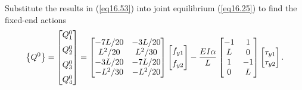 \documentclass{AeroStructure-ERJohnson}
\begin{document}
Substitute the results in (\ref{eq16.53}) into joint equilibrium (\ref{eq16.25}) to find the fixed-end actions
\begin{align}\label{eq16.54}
\left\{Q^{0}\right\}=\left[\begin{array}{@{}l@{}}Q_{1}^{0} \\[6pt]Q_{2}^{0} \\[6pt]Q_{3}^{0} \\[6pt]Q_{4}^{0}\end{array}\right]=\left[\begin{array}{@{}cc@{}}-7 L / 20 & -3 L / 20 \\L^{2} / 20 & L^{2} / 30 \\-3 L / 20 & -7 L / 20 \\-L^{2} / 30 & -L^{2} / 20\end{array}\right]\left[\begin{array}{@{}l@{}}f_{y 1} \\[3pt]f_{y 2}\end{array}\right]-\frac{E I \alpha}{L}\left[\begin{array}{@{}cc@{}}-1 & 1 \\L & 0 \\1 & -1 \\0 & L\end{array}\right]\left[\begin{array}{@{}c@{}}\tau_{y 1} \\\tau_{y 2}\end{array}\right].
\end{align}

\vspace*{-1pc}
\end{document}
